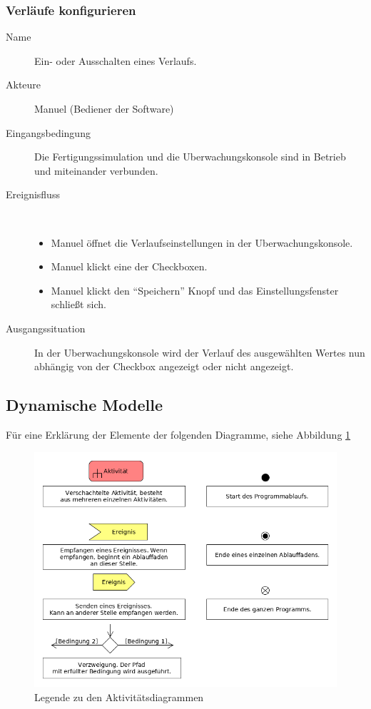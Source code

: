\documentclass[parskip=full]{scrartcl}
\begin{document}
\subsubsection{Verläufe konfigurieren}
\begin{description}
  \item[Name] Ein- oder Ausschalten eines Verlaufs.
  \item[Akteure] Manuel (Bediener der Software)
  \item[Eingangsbedingung] Die \gls{Fertigungssimulation} und die \gls{Uberwachungskonsole} sind in Betrieb und miteinander verbunden.
  \item[Ereignisfluss]~\\
  \begin{itemize}[noitemsep]
    \item Manuel öffnet die Verlaufseinstellungen in der \gls{Uberwachungskonsole}.
    \item Manuel klickt eine der Checkboxen.
    \item Manuel klickt den "`Speichern"' Knopf und das Einstellungsfenster schließt sich.
  \end{itemize}
  \item[Ausgangssituation] In der \gls{Uberwachungskonsole} wird der Verlauf des ausgewählten Wertes nun abhängig von der Checkbox angezeigt oder nicht angezeigt.
\end{description}


\subsection{Dynamische Modelle}
Für eine Erklärung der Elemente der folgenden Diagramme, siehe Abbildung \ref{explanation}
\begin{figure}[H]
  \centering
  \includegraphics[scale=0.62]{media/Activities/explanation.png}
  \caption{Legende zu den Aktivitätsdiagrammen}
  \label{explanation}
\end{figure}
\end{document}
